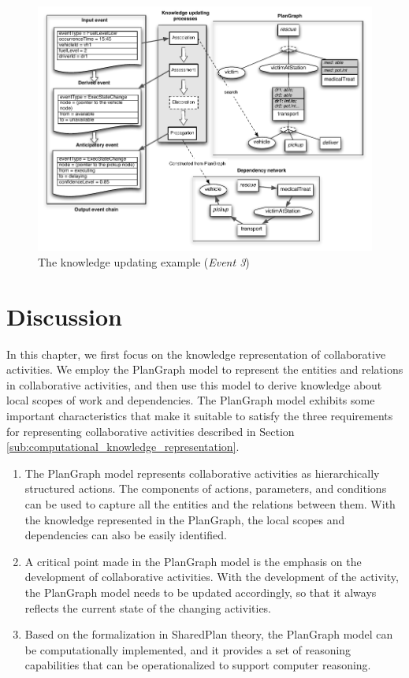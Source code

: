 \begin{figure}[htbp] %
	\centering
	\includegraphics{update_example_event3.pdf} 
	\caption{The knowledge updating example (\emph{Event 3})}
	\label{fig:update_example_event3}
\end{figure}

\section{Discussion} %
\label{sec:knowledge_representation_discussion}
In this chapter, we first focus on the knowledge representation of collaborative activities. We employ the PlanGraph model to represent the entities and relations in collaborative activities, and then use this model to derive knowledge about local scopes of work and dependencies. The PlanGraph model exhibits some important characteristics that make it suitable to satisfy the three requirements for representing collaborative activities described in Section \ref{sub:computational_knowledge_representation}.

\begin{enumerate}
   \item The PlanGraph model represents collaborative activities as hierarchically structured actions. The components of actions, parameters, and conditions can be used to capture all the entities and the relations between them. With the knowledge represented in the PlanGraph, the local scopes and dependencies can also be easily identified. 
   \item A critical point made in the PlanGraph model is the emphasis on the development of collaborative activities. With the development of the activity, the PlanGraph model needs to be updated accordingly, so that it always  reflects the current state of the changing activities.
   \item Based on the formalization in SharedPlan theory, the PlanGraph model can be computationally implemented, and it provides a set of reasoning capabilities that can be operationalized to support computer reasoning.  
\end{enumerate}

